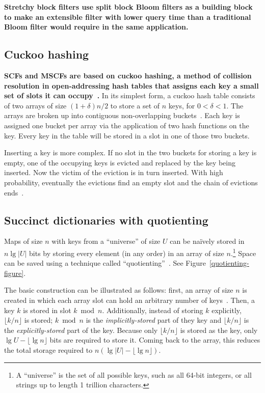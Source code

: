 \documentclass[letterpaper,twocolumn,10pt]{article}
\newcommand{\Taffy}{Stretchy}
\newcommand{\TCF}{SCF}
\newcommand{\MTCF}{MSCF}
\newcommand{\Taffy}{Taffy}
\newcommand{\TCF}{TCF}
\newcommand{\MTCF}{MTCF}
\begin{document}
{\bf \Taffy{} block filters use split block Bloom filters as a building block to make an extensible filter with lower query time than a traditional Bloom filter would require in the same application.}

\subsection{Cuckoo hashing}

{\bf \TCF{}s and \MTCF{}s are based on cuckoo hashing, a method of collision resolution in open-address\-ing hash tables that assigns each key a small set of slots it can occupy~\cite{cuckoo-journal}.}
In its simplest form, a cuckoo hash table consists of two arrays of size $(1 + \delta)n/2$ to store a set of $n$ keys, for $0 < \delta < 1$.
The arrays are broken up into contiguous non-overlapping buckets~\cite{buckets,load-thresholds}.
Each key is assigned one bucket per array via the application of two hash functions on the key.
Every key in the table will be stored in a slot in one of those two buckets.

Inserting a key is more complex.
If no slot in the two buckets for storing a key is empty, one of the occupying keys is evicted and replaced by the key being inserted.
Now the victim of the eviction is in turn inserted.
With high probability, eventually the evictions find an empty slot and the chain of evictions ends~\cite{cuckoo-journal}.

\subsection{Succinct dictionaries with quotienting}
\label{quotienting}

Maps of size $n$ with keys from a ``universe'' of size $U$ can be na\"ively stored in $n \lg |U|$ bits by storing every element (in any order) in an array of size $n$.\footnote{A ``universe'' is the set of all possible keys, such as all 64-bit integers, or all strings up to length 1 trillion characters.}
Space can be saved using a technique called ``quotienting''~\cite{knuth,quotient-filter}.
See Figure~\ref{quotienting-figure}.

The basic construction can be illustrated as follows:
first, an array of size $n$ is created in which each array slot can hold an arbitrary number of keys~\cite{raman-practical}.
Then, a key $k$ is stored in slot $k \bmod n$.
Additionally, instead of storing $k$ explicitly, $\lfloor k / n \rfloor$ is stored;
$k \bmod n$ is the {\em implicitly-stored} part of they key and $\lfloor k / n \rfloor$ is the {\em explicitly-stored} part of the key.
Because only $\lfloor k / n \rfloor$ is stored as the key, only $\lg U - \lfloor \lg n \rfloor$ bits are required to store it.
Coming back to the array, this reduces the total storage required to $n (\lg |U| - \lfloor \lg n \rfloor)$.
\end{document}
